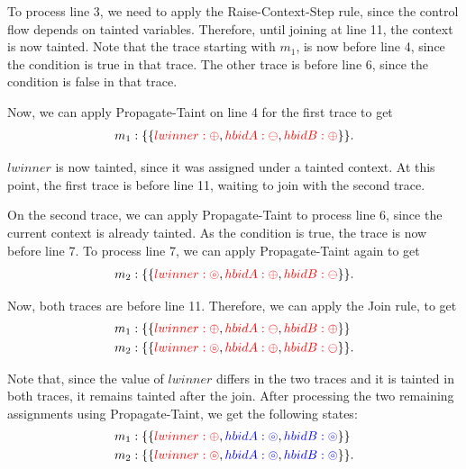 \documentclass[12pt,a4paper]{article}
\newcommand{\tainted}[1]{\textcolor{red}{#1}}
\newcommand{\untainted}[1]{\textcolor{blue}{#1}}
\begin{document}
To process line 3, we need to apply the Raise-Context-Step rule, since the control flow depends on
tainted variables. Therefore, until joining at line 11, the context is now tainted. Note that 
the trace starting with $m_1$, is now before line 4, since the condition is true in that trace. 
The other trace is before line 6, since the condition is false in that trace.

Now, we can apply Propagate-Taint on line 4 for the first trace to get 
\begin{align*}
    m_1 &: \{\{\tainted{lwinner: \oplus}, \tainted{hbidA: \ominus}, \tainted{hbidB: \oplus}\}\}. \\
\end{align*}

$lwinner$ is now tainted, since it was assigned under a tainted context. At this point, the first 
trace is before line 11, waiting to join with the second trace. 

On the second trace, we can apply Propagate-Taint to process line 6, since the current context is 
already tainted. As the condition is true, the trace is now before line 7. To process line 7, we can 
apply Propagate-Taint again to get
\begin{align*}
    m_2 &: \{\{\tainted{lwinner: \circledcirc}, \tainted{hbidA: \oplus}, \tainted{hbidB: \ominus}\}\}. \\
\end{align*}

Now, both traces are before line 11. Therefore, we can apply the Join rule, to get
\begin{align*}
    m_1 &: \{\{\tainted{lwinner: \oplus}, \tainted{hbidA: \ominus}, \tainted{hbidB: \oplus}\}\} \\
    m_2 &: \{\{\tainted{lwinner: \circledcirc}, \tainted{hbidA: \oplus}, \tainted{hbidB: \ominus}\}\}. \\
\end{align*}

Note that, since the value of $lwinner$ differs in the two traces and it is tainted in both traces, 
it remains tainted after the join. After processing the two remaining assignments using Propagate-Taint, 
we get the following states:
\begin{align*}
    m_1 &: \{\{\tainted{lwinner: \oplus}, \untainted{hbidA: \circledcirc}, \untainted{hbidB: \circledcirc}\}\} \\
    m_2 &: \{\{\tainted{lwinner: \circledcirc}, \untainted{hbidA: \circledcirc}, \untainted{hbidB: \circledcirc}\}\}. \\
\end{align*}
\end{document}
